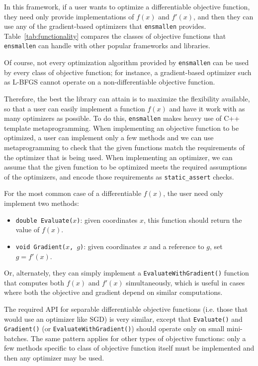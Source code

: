 \documentclass{article}
\begin{document}
In this framework, if a user wants to optimize a differentiable objective
function, they need only provide implementations of $f(x)$ and $f'(x)$, and
then they can use any of the gradient-based optimizers that {\tt ensmallen}
provides.  Table~\ref{tab:functionality} compares
the classes of objective functions that {\tt ensmallen} can handle with other
popular frameworks and libraries.

Of course, not every optimization algorithm provided by {\tt ensmallen} can be
used by every class of objective function; for instance, a gradient-based
optimizer such as L-BFGS cannot operate on a non-differentiable objective
function.

Therefore, the best the library can attain is to maximize the flexibility
available, so that a user can easily implement a function $f(x)$ and have it
work with as many optimizers as possible.
To do this, {\tt ensmallen} makes heavy use of C++ template metaprogramming.
When implementing an objective function to be
optimized, a user can implement only a few methods and we can use
metaprogramming to check that the given functions match the requirements of the
optimizer that is being used.  When implementing an optimizer, we can assume
that the given function to be optimized meets the required assumptions of the
optimizers, and encode those requirements as \texttt{static\_assert} checks.

For the most common case of a differentiable $f(x)$, the user need only
implement two methods:

\vspace*{-0.3em}
\begin{itemize} \itemsep -1pt
  \item \texttt{double Evaluate($x$)}: given coordinates $x$, this function
should return the value of $f(x)$.
  \item \texttt{void Gradient($x$, $g$)}: given coordinates $x$ and a reference
to $g$, set $g = f'(x)$.
\end{itemize}
\vspace*{-0.3em}

Or, alternately, they can simply implement a \texttt{EvaluateWithGradient()}
function that computes both $f(x)$ and $f'(x)$ simultaneously, which is useful
in cases where both the objective and gradient depend on similar computations.

The required API for separable differentiable objective functions (i.e. those
that would use an optimizer like SGD) is very similar, except that
\texttt{Evaluate()} and \texttt{Gradient()} (or \texttt{EvaluateWithGradient()})
should operate only on small mini-batches.  The same pattern applies for other
types of objective functions: only a few methods specific to class of objective
function itself must be implemented and then any optimizer may be used.
\end{document}
